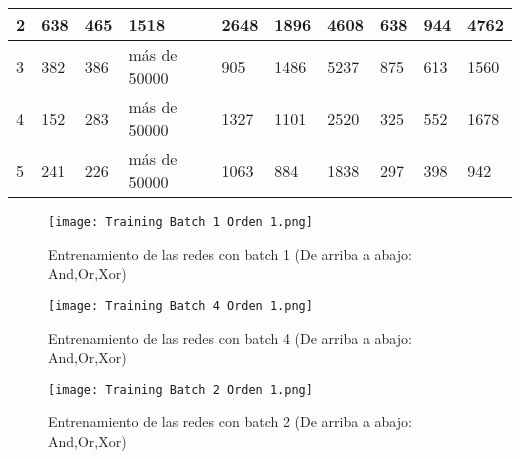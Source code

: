\begin{table}[H]
\begin{tabular}{|l|lllllllll|}
    2                                                      & \multicolumn{1}{l|}{638}          & \multicolumn{1}{l|}{465}         & \multicolumn{1}{l|}{1518}         & \multicolumn{1}{l|}{2648}         & \multicolumn{1}{l|}{1896}        & \multicolumn{1}{l|}{4608}         & \multicolumn{1}{l|}{638}          & \multicolumn{1}{l|}{944}         & 4762         \\ \hline
    3                                                      & \multicolumn{1}{l|}{382}          & \multicolumn{1}{l|}{386}         & \multicolumn{1}{l|}{más de 50000} & \multicolumn{1}{l|}{905}          & \multicolumn{1}{l|}{1486}        & \multicolumn{1}{l|}{5237}         & \multicolumn{1}{l|}{875}          & \multicolumn{1}{l|}{613}         & 1560         \\ \hline
    4                                                      & \multicolumn{1}{l|}{152}          & \multicolumn{1}{l|}{283}         & \multicolumn{1}{l|}{más de 50000} & \multicolumn{1}{l|}{1327}         & \multicolumn{1}{l|}{1101}        & \multicolumn{1}{l|}{2520}         & \multicolumn{1}{l|}{325}          & \multicolumn{1}{l|}{552}         & 1678         \\ \hline
    5                                                      & \multicolumn{1}{l|}{241}          & \multicolumn{1}{l|}{226}         & \multicolumn{1}{l|}{más de 50000} & \multicolumn{1}{l|}{1063}         & \multicolumn{1}{l|}{884}         & \multicolumn{1}{l|}{1838}         & \multicolumn{1}{l|}{297}          & \multicolumn{1}{l|}{398}         & 942          \\ \hline
    \end{tabular}
\end{table}

\begin{figure}[H]
    \centering
    \texttt{[image: Training Batch 1 Orden 1.png]}
    \caption{Entrenamiento de las redes con batch 1 (De arriba a abajo: And,Or,Xor)}
    \label{fig:TrainBatch1_Order1}
\end{figure}
\begin{figure}[H]
    \centering
    \texttt{[image: Training Batch 4 Orden 1.png]}
    \caption{Entrenamiento de las redes con batch 4 (De arriba a abajo: And,Or,Xor)}
    \label{fig:TrainBatch4_Order1}
\end{figure}
\begin{figure}[H]
    \centering
    \texttt{[image: Training Batch 2 Orden 1.png]}
    \caption{Entrenamiento de las redes con batch 2 (De arriba a abajo: And,Or,Xor)}
    \label{fig:TrainBatch2_Order1}
\end{figure}


